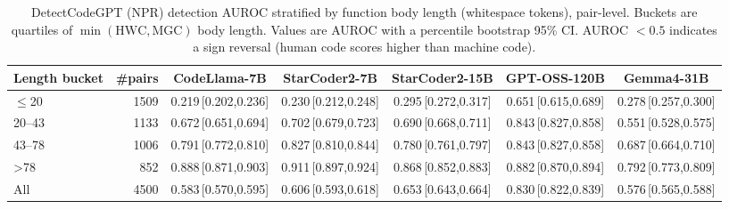 \begin{table}[t]
\centering
\caption{DetectCodeGPT (NPR) detection AUROC stratified by function body length (whitespace tokens), pair-level. Buckets are quartiles of $\min(\text{HWC},\text{MGC})$ body length. Values are AUROC with a percentile bootstrap 95\% CI. AUROC $<0.5$ indicates a sign reversal (human code scores higher than machine code).}
\label{tab:auroc-by-length}
\begin{tabular}{lrccccc}
\toprule
Length bucket & \#pairs & CodeLlama-7B & StarCoder2-7B & StarCoder2-15B & GPT-OSS-120B & Gemma4-31B \\
\midrule
$\leq$20 & 1509 & 0.219\,\tiny[0.202,0.236] & 0.230\,\tiny[0.212,0.248] & 0.295\,\tiny[0.272,0.317] & 0.651\,\tiny[0.615,0.689] & 0.278\,\tiny[0.257,0.300] \\
20--43 & 1133 & 0.672\,\tiny[0.651,0.694] & 0.702\,\tiny[0.679,0.723] & 0.690\,\tiny[0.668,0.711] & 0.843\,\tiny[0.827,0.858] & 0.551\,\tiny[0.528,0.575] \\
43--78 & 1006 & 0.791\,\tiny[0.772,0.810] & 0.827\,\tiny[0.810,0.844] & 0.780\,\tiny[0.761,0.797] & 0.843\,\tiny[0.827,0.858] & 0.687\,\tiny[0.664,0.710] \\
>78 & 852 & 0.888\,\tiny[0.871,0.903] & 0.911\,\tiny[0.897,0.924] & 0.868\,\tiny[0.852,0.883] & 0.882\,\tiny[0.870,0.894] & 0.792\,\tiny[0.773,0.809] \\
\midrule
All & 4500 & 0.583\,\tiny[0.570,0.595] & 0.606\,\tiny[0.593,0.618] & 0.653\,\tiny[0.643,0.664] & 0.830\,\tiny[0.822,0.839] & 0.576\,\tiny[0.565,0.588] \\
\bottomrule
\end{tabular}
\end{table}
